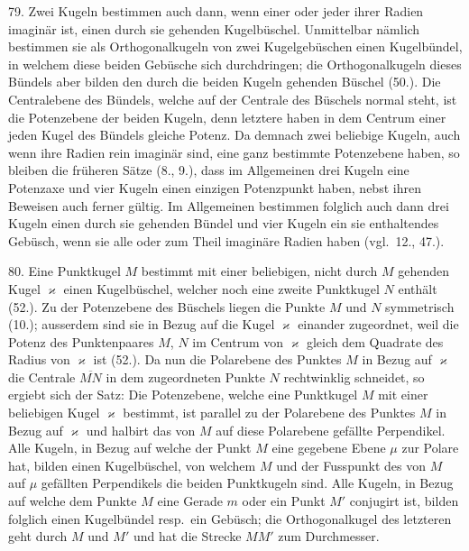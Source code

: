 79. Zwei Kugeln bestimmen auch dann, wenn einer
oder jeder ihrer Radien imagin\"ar ist, einen durch sie gehenden
Kugelb\"uschel. Unmittelbar n\"amlich bestimmen sie als
Orthogonalkugeln von zwei Kugelgeb\"uschen einen Kugelb\"undel,
in welchem diese beiden Geb\"usche sich durchdringen;
die Orthogonalkugeln dieses B\"undels aber bilden den durch
die beiden Kugeln gehenden B\"uschel (50.). Die Centralebene
des B\"undels, welche auf der Centrale des B\"uschels
normal steht, ist die Potenzebene der beiden Kugeln, denn
letztere haben in dem Centrum einer jeden Kugel des B\"undels
gleiche Potenz. Da demnach zwei beliebige Kugeln,
auch wenn ihre Radien rein imagin\"ar sind, eine ganz bestimmte
Potenzebene haben, so bleiben die fr\"uheren S\"atze
(8., 9.), dass im Allgemeinen drei Kugeln eine Potenzaxe
und vier Kugeln einen einzigen Potenzpunkt haben, nebst
ihren Beweisen auch ferner g\"ultig. Im Allgemeinen bestimmen
folglich auch dann drei Kugeln einen durch sie gehenden
B\"undel und vier Kugeln ein sie enthaltendes Geb\"usch,
wenn sie alle oder zum Theil imagin\"are Radien haben (vgl.\ 12., 47.).

80. Eine Punktkugel $M$ bestimmt mit einer beliebigen,
nicht durch $M$ gehenden Kugel $\varkappa$ einen Kugelb\"uschel, welcher
noch eine zweite Punktkugel $N$ enth\"alt (52.). Zu der
Potenzebene des B\"uschels liegen die Punkte $M$ und $N$ symmetrisch
(10.); ausserdem sind sie in Bezug auf die Kugel $\varkappa$
einander zugeordnet, weil die Potenz des Punktenpaares $M$, $N$
im Centrum von $\varkappa$ gleich dem Quadrate des Radius von $\varkappa$
ist (52.). Da nun die Polarebene des Punktes $M$ in Bezug
auf $\varkappa$ die Centrale $\overline{MN}$ in dem zugeordneten Punkte $N$
rechtwinklig schneidet, so ergiebt sich der Satz: {\glqq}Die Potenzebene,
welche eine Punktkugel $M$ mit einer beliebigen Kugel
$\varkappa$ bestimmt, ist parallel zu der Polarebene des Punktes $M$
in Bezug auf $\varkappa$ und halbirt das von $M$ auf diese Polarebene
gef\"allte Perpendikel{\grqq}. Alle Kugeln, in Bezug auf welche der
Punkt $M$ eine gegebene Ebene $\mu$ zur Polare hat, bilden einen
Kugelb\"uschel, von welchem $M$ und der Fusspunkt des von $M$
auf $\mu$ gef\"allten Perpendikels die beiden Punktkugeln sind.
Alle Kugeln, in Bezug auf welche dem Punkte $M$ eine Gerade
$m$ oder ein Punkt $M'$ conjugirt ist, bilden folglich
einen Kugelb\"undel resp.\ ein Geb\"usch; die Orthogonalkugel
des letzteren geht durch $M$ und $M'$ und hat die Strecke
$MM'$ zum Durchmesser.

